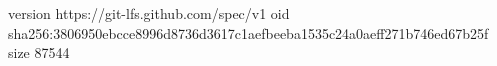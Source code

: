 version https://git-lfs.github.com/spec/v1
oid sha256:3806950ebcce8996d8736d3617c1aefbeeba1535c24a0aeff271b746ed67b25f
size 87544
